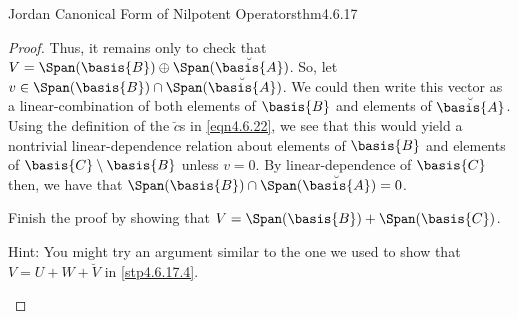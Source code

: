 \begin{thm}{Jordan Canonical Form of Nilpotent Operators}{thm4.6.17}
\begin{proof}
		Thus, it remains only to check that $V=\Span (\basis{B})\oplus \Span (\breve{\basis{A}})$.  So, let $v\in \Span (\basis{B})\cap \Span (\breve{\basis{A}})$.  We could then write this vector as a linear-combination of both elements of $\basis{B}$ and elements of $\breve{\basis{A}}$.  Using the definition of the $\breve{c}$s in \eqref{eqn4.6.22}, we see that this would yield a nontrivial linear-dependence relation about elements of $\basis{B}$ and elements of $\basis{C}\setminus \basis{B}$ unless $v=0$.  By linear-dependence of $\basis{C}$ then, we have that $\Span (\basis{B})\cap \Span (\breve{\basis{A}})=0$.
		\begin{exr}[breakable=false]{}{}
			Finish the proof by showing that $V=\Span (\basis{B})+\Span (\basis{C})$.
			\begin{rmk}
				Hint:  You might try an argument similar to the one we used to show that $V=U+W+\breve{V}$ in \cref{stp4.6.17.4}.
			\end{rmk}
		\end{exr}
	\end{proof}
\end{thm}

